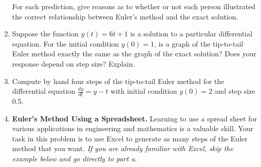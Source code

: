 \begin{enumerate}
For each prediction, give reasons as to whether or not each person illustrated the correct relationship between Euler's method and the exact solution. 

\item Suppose the function $y(t) = 6t +1$ is a solution to a particular differential equation. For the initial condition $y(0) = 1$, is a graph of the tip-to-tail Euler method exactly the same as the graph of the exact solution? Does your response depend on step size? Explain. \label{03HWproblem4}

\item Compute by hand four steps of the tip-to-tail Euler method for the differential equation $\displaystyle\frac{dy}{dt}=y-t$  with initial condition $y(0) = 2$ and step size 0.5. \label{03HWproblem5}

\clearpage

\item	\textbf{Euler's Method Using a Spreadsheet.} Learning to use a spread sheet for various applications in engineering and mathematics is a valuable skill. Your task in this problem is to use Excel to generate as many steps of the Euler method that you want. \textit{If you are already familiar with Excel, skip the example below and go directly to part a}. \label{03HWproblem6}


\end{enumerate}

